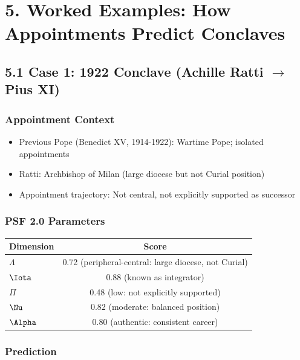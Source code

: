 \section{5. Worked Examples: How Appointments Predict Conclaves}

\subsection{5.1 Case 1: 1922 Conclave (Achille Ratti $\to$ Pius XI)}

\subsubsection{Appointment Context}

\begin{itemize}
\item Previous Pope (Benedict XV, 1914-1922): Wartime Pope; isolated appointments
\item Ratti: Archbishop of Milan (large diocese but not Curial position)
\item Appointment trajectory: Not central, not explicitly supported as successor
\end{itemize}

\subsubsection{PSF 2.0 Parameters}

\begin{table}[h]
\centering
\begin{tabular}{|l|c|}
\hline
Dimension & Score \\
\hline
$\Lambda$ & 0.72 (peripheral-central: large diocese, not Curial) \\
$\Iota$ & 0.88 (known as integrator) \\
$\Pi$ & 0.48 (low: not explicitly supported) \\
$\Nu$ & 0.82 (moderate: balanced position) \\
$\Alpha$ & 0.80 (authentic: consistent career) \\
\hline
\end{tabular}
\end{table}

\subsubsection{Prediction}

